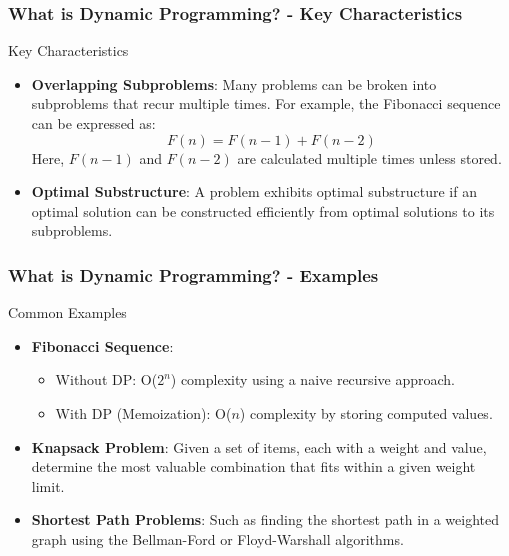 \documentclass[aspectratio=169]{beamer}
\begin{document}
\begin{frame}[fragile]
  \frametitle{What is Dynamic Programming? - Key Characteristics}
  \begin{block}{Key Characteristics}
    \begin{itemize}
      \item \textbf{Overlapping Subproblems}: 
      Many problems can be broken into subproblems that recur multiple times. 
      For example, the Fibonacci sequence can be expressed as:
      \begin{equation}
        F(n) = F(n-1) + F(n-2)
      \end{equation}
      Here, $F(n-1)$ and $F(n-2)$ are calculated multiple times unless stored.
      
      \item \textbf{Optimal Substructure}: 
      A problem exhibits optimal substructure if an optimal solution can be constructed efficiently from optimal solutions to its subproblems.
    \end{itemize}
  \end{block}
\end{frame}

\begin{frame}[fragile]
  \frametitle{What is Dynamic Programming? - Examples}
  \begin{block}{Common Examples}
    \begin{itemize}
      \item \textbf{Fibonacci Sequence}: 
      \begin{itemize}
        \item Without DP: O($2^n$) complexity using a naive recursive approach.
        \item With DP (Memoization): O($n$) complexity by storing computed values.
      \end{itemize}
      \item \textbf{Knapsack Problem}: 
      Given a set of items, each with a weight and value, determine the most valuable combination that fits within a given weight limit.
      \item \textbf{Shortest Path Problems}: 
      Such as finding the shortest path in a weighted graph using the Bellman-Ford or Floyd-Warshall algorithms.
    \end{itemize}
  \end{block}
\end{frame}
\end{document}

